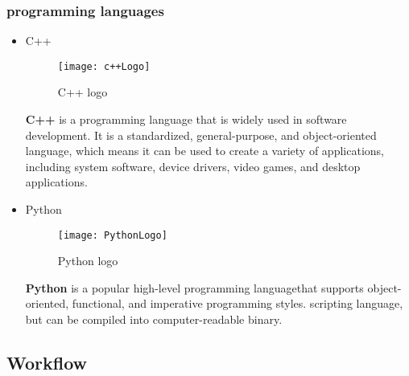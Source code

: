 \subsubsection{programming languages}
\begin{itemize}

\item C++
\FloatBarrier
\begin{figure}[h]
         \centering
        \texttt{[image: c++Logo]}
   
        \caption{C++ logo}
        \label{fig:c++Logo}
    \end{figure}
\FloatBarrier
\subitem\textbf{C++} is a programming language that is widely used in software development. It is a standardized, general-purpose, and object-oriented language, which means it can be used to create a variety of applications, including system software, device drivers, video games, and desktop applications.\cite{SD20}

\item Python
\FloatBarrier
\begin{figure}[h]
         \centering
        \texttt{[image: PythonLogo]}
   
        \caption{Python logo}
        \label{fig:PythonLogo}
    \end{figure}
\FloatBarrier
\subitem\textbf{Python} is a popular high-level programming languagethat supports object-oriented, functional, 
and imperative programming styles. scripting language, but can be compiled into computer-readable binary.\cite{SD20}


\end{itemize}

\subsection{Workflow}

%




%